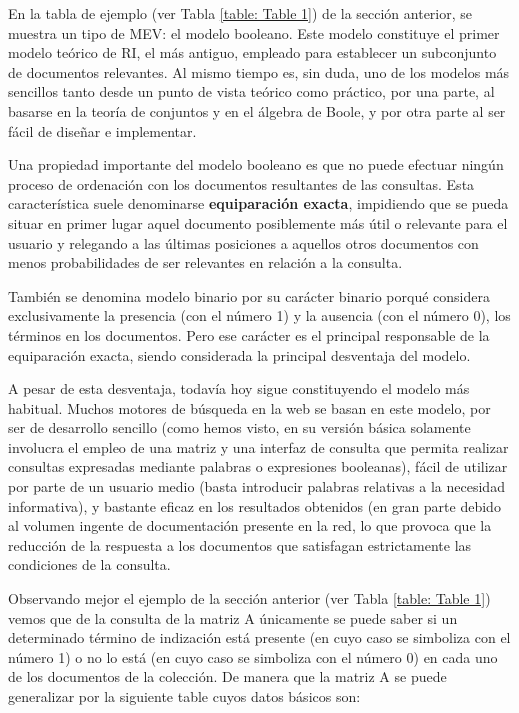 \documentclass{article}
\begin{document}
En la tabla de ejemplo (ver Tabla \ref{table: Table 1}) de la sección anterior, se muestra un tipo de MEV: el modelo booleano. Este modelo constituye el primer modelo teórico de RI, el más antiguo, empleado para establecer un subconjunto de documentos relevantes. Al mismo tiempo es, sin duda, uno de los modelos más sencillos tanto desde un punto de vista teórico como práctico, por una parte, al basarse en la teoría de conjuntos y en el álgebra de Boole, y por otra parte al ser fácil de diseñar e implementar.

Una propiedad importante del modelo booleano es que no puede efectuar ningún proceso de ordenación con los documentos resultantes de las consultas. Esta característica suele denominarse \textbf{equiparación exacta}, impidiendo que se pueda situar en primer lugar aquel documento posiblemente más útil o relevante para el usuario y relegando a las últimas posiciones a aquellos otros documentos con menos probabilidades de ser relevantes en relación a la consulta.

También se denomina modelo binario por su carácter binario porqué considera exclusivamente la presencia (con el número 1) y la ausencia (con el número 0), los términos en los documentos. Pero ese carácter es el principal responsable de la equiparación exacta, siendo considerada la principal desventaja del modelo. 

A pesar de esta desventaja, todavía hoy sigue constituyendo el modelo más habitual. Muchos motores de búsqueda en la web se basan en este modelo, por ser de desarrollo sencillo (como hemos visto, en su versión básica solamente involucra el empleo de una matriz y una interfaz de consulta que permita realizar consultas expresadas mediante palabras o expresiones booleanas), fácil de utilizar por parte de un usuario medio (basta introducir palabras relativas a la necesidad informativa), y bastante eficaz en los resultados obtenidos (en gran parte debido al volumen ingente de documentación presente en la red, lo que provoca que la reducción de la respuesta a los documentos que satisfagan estrictamente las condiciones de la consulta.

Observando mejor el ejemplo de la sección anterior (ver Tabla \ref{table: Table 1}) vemos que de la consulta de la matriz A únicamente se puede saber si un determinado término de indización está presente (en cuyo caso se simboliza con el número 1) o no lo está (en cuyo caso se simboliza con el número 0) en cada uno de los documentos de la colección. De manera que la matriz A se puede generalizar por la siguiente table cuyos datos básicos son:
\end{document}
